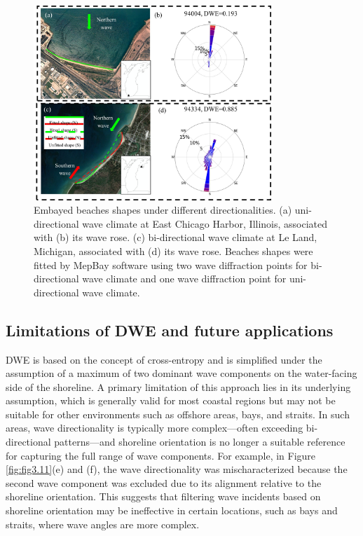 \begin{figure}[htbp]
  \centering
  \includegraphics[width=0.8\textwidth]{chapter3/resources/figure3-12.jpg}
  \caption{Embayed beaches shapes under different directionalities. (a) uni-directional wave climate at East Chicago Harbor, Illinois, associated with (b) its wave rose. (c) bi-directional wave climate at Le Land, Michigan, associated with (d) its wave rose. Beaches shapes were fitted by MepBay software using two wave diffraction points for bi-directional wave climate and one wave diffraction point for uni-directional wave climate.}
  \label{fig:fig3.12}
\end{figure}

\subsection{Limitations of DWE and future applications}
\label{c3_Limitations of DWE and future applications}
DWE is based on the concept of cross-entropy and is simplified under the assumption of a maximum of two dominant wave components on the water-facing side of the shoreline. A primary limitation of this approach lies in its underlying assumption, which is generally valid for most coastal regions but may not be suitable for other environments such as offshore areas, bays, and straits. In such areas, wave directionality is typically more complex—often exceeding bi-directional patterns—and shoreline orientation is no longer a suitable reference for capturing the full range of wave components. For example, in Figure \ref{fig:fig3.11}(e) and (f), the wave directionality was mischaracterized because the second wave component was excluded due to its alignment relative to the shoreline orientation. This suggests that filtering wave incidents based on shoreline orientation may be ineffective in certain locations, such as bays and straits, where wave angles are more complex.

